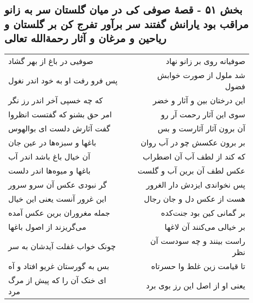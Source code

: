 \begin{center}
\section*{بخش ۵۱ - قصهٔ صوفی کی در میان گلستان سر به زانو مراقب بود یارانش گفتند سر برآور تفرج کن بر گلستان و ریاحین و مرغان و آثار رحمةالله تعالی}
\label{sec:sh051}
\begin{longtable}{l p{0.5cm} r}
صوفیی در باغ از بهر گشاد
&&
صوفیانه روی بر زانو نهاد
\\
پس فرو رفت او به خود اندر نغول
&&
شد ملول از صورت خوابش فضول
\\
که چه خسپی آخر اندر رز نگر
&&
این درختان بین و آثار و خضر
\\
امر حق بشنو که گفتست انظروا
&&
سوی این آثار رحمت آر رو
\\
گفت آثارش دلست ای بوالهوس
&&
آن برون آثار آثارست و بس
\\
باغها و سبزه‌ها در عین جان
&&
بر برون عکسش چو در آب روان
\\
آن خیال باغ باشد اندر آب
&&
که کند از لطف آب آن اضطراب
\\
باغها و میوه‌ها اندر دلست
&&
عکس لطف آن برین آب و گلست
\\
گر نبودی عکس آن سرو سرور
&&
پس نخواندی ایزدش دار الغرور
\\
این غرور آنست یعنی این خیال
&&
هست از عکس دل و جان رجال
\\
جمله مغروران برین عکس آمده
&&
بر گمانی کین بود جنت‌کده
\\
می‌گریزند از اصول باغها
&&
بر خیالی می‌کنند آن لاغها
\\
چونک خواب غفلت آیدشان به سر
&&
راست بینند و چه سودست آن نظر
\\
بس به گورستان غریو افتاد و آه
&&
تا قیامت زین غلط وا حسرتاه
\\
ای خنک آن را که پیش از مرگ مرد
&&
یعنی او از اصل این رز بوی برد
\\
\end{longtable}
\end{center}
